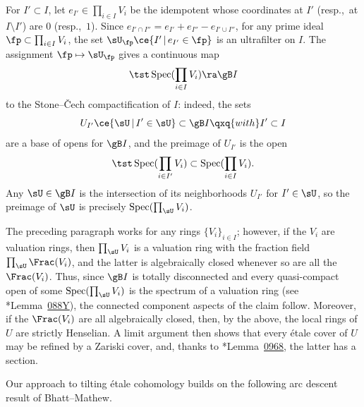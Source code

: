 \bpf
For $I' \subset I$, let $e_{I'} \in \prod_{i \in I} V_i$ be the idempotent whose coordinates at $I'$ (resp.,~at $I \setminus I'$) are $0$ (resp.,~$1$). Since $e_{I' \cap I''} = e_{I'} + e_{I''} - e_{I' \cup I''}$, for any prime ideal $\fp \subset \prod_{i \in I} V_i$, the set $\sU_\fp \ce \{ I' \, \vert\, e_{I'} \in \fp\}$ is an ultrafilter on $I$. The assignment $\fp \mapsto \sU_\fp$ gives a continuous map
\[
\tst\Spec(\prod_{i \in I} V_i) \ra \gB I
\]
to the Stone--\v{C}ech compactification of $I$: indeed, the sets
\[
U_{I'} \ce \{ \sU \, \vert \, I' \in \sU\} \subset \gB I \qxq{with} I' \subset I
\]
are a base of opens for $\gB I$, and the preimage of $U_{I'}$ is the open
\[
\tst\Spec(\prod_{i \in I'} V_i) \subset \Spec(\prod_{i \in I} V_i).
\] %
Any $\sU \in \gB I$ is the intersection of its neighborhoods $U_{I'}$ for $I' \in \sU$, so the preimage of $\sU$ is precisely $\Spec(\prod_{\sU} V_i)$.

The preceding paragraph works for any rings $\{V_i\}_{i \in I}$; however, if the $V_i$ are valuation rings, then $\prod_{\sU} V_i$ is a valuation ring with the fraction field $\prod_{\sU} \Frac(V_i)$, and the latter is algebraically closed whenever so are all the $\Frac(V_i)$. Thus, since $\gB I$ is totally disconnected and every quasi-compact open of some $\Spec(\prod_{\sU} V_i)$ is the spectrum of a valuation ring (see \cite{SP}*{Lemma~\href{https://stacks.math.columbia.edu/tag/088Y}{088Y}}), the connected component aspects of the claim follow. Moreover, if the $\Frac(V_i)$ are all algebraically closed, then, by the above, the local rings of $U$ are strictly Henselian. A limit argument then shows that every \'{e}tale cover of $U$ may be refined by a Zariski cover, and, thanks to \cite{SP}*{Lemma~\href{https://stacks.math.columbia.edu/tag/0968}{0968}}, the latter has a section.
\epf



Our approach to tilting \'{e}tale cohomology builds on the following arc descent result of Bhatt--Mathew. %

